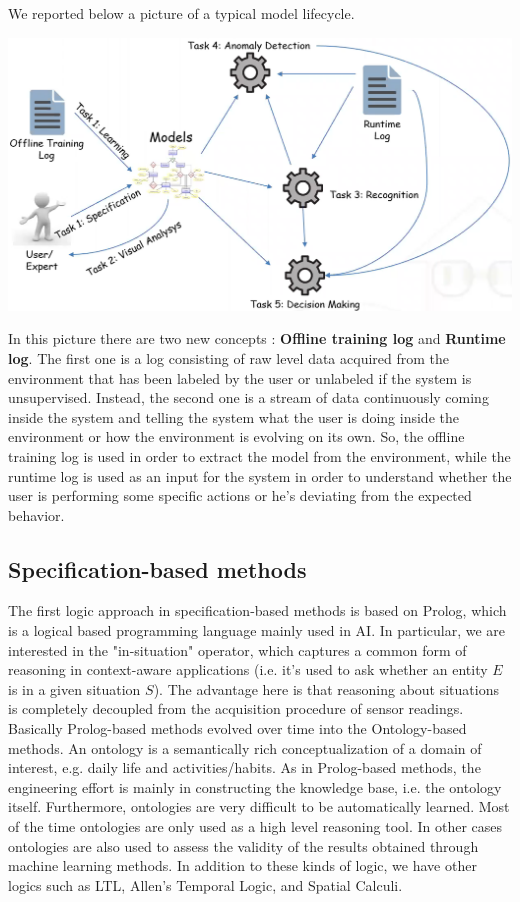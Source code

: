 \documentclass[11pt]{article}
\begin{document}
We reported below a picture of a typical model lifecycle.

\begin{center}
\includegraphics[scale=0.14]{./images/model_lifecycle.png}
\end{center}

In this picture there are two new concepts : \textbf{Offline training log} and \textbf{Runtime log}. The first one is a log consisting of raw level data acquired from the environment that has been labeled by the user or unlabeled if the system is unsupervised. Instead, the second one is a stream of data continuously coming inside the system and telling the system what the user is doing inside the environment or how the environment is evolving on its own. So, the offline training log is used in order to extract the model from the environment, while the runtime log is used as an input for the system in order to understand whether the user is performing some specific actions or he's deviating from the expected behavior.

\subsection{Specification-based methods}
The first logic approach in specification-based methods is based on Prolog, which is a logical based programming language mainly used in AI. In particular, we are interested in the "in-situation" operator, which captures a common form of reasoning in context-aware applications (i.e. it's used to ask whether an entity $E$ is in a given situation $S$). The advantage here is that reasoning about situations is completely decoupled from the acquisition procedure of sensor readings. Basically Prolog-based methods evolved over time into the Ontology-based methods. An ontology is a semantically rich conceptualization of a domain of interest, e.g. daily life and activities/habits. As in Prolog-based methods, the engineering effort is mainly in constructing the knowledge base, i.e. the ontology itself. Furthermore, ontologies are very difficult to be automatically learned. Most of the time ontologies are only used as a high level reasoning tool. In other cases ontologies are also used to assess the validity of the results obtained through machine learning methods. In addition to these kinds of logic, we have other logics such as LTL, Allen's Temporal Logic,  and Spatial Calculi.
\end{document}
